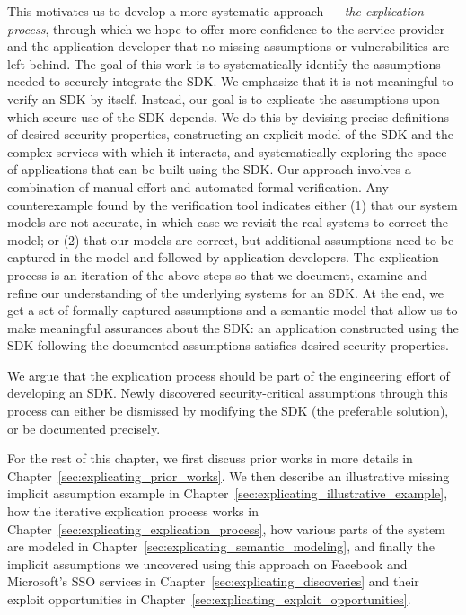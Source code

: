 This motivates us to develop a more systematic approach --- \emph{the explication process}, through which we hope to offer more confidence to the service provider and the application developer that no missing assumptions or vulnerabilities are left behind.  The goal of this work is to systematically identify the assumptions needed to securely integrate the SDK.  We emphasize that it is not meaningful to verify an SDK by itself.  Instead, our goal is to explicate the assumptions upon which secure use of the SDK depends.  We do this by devising precise definitions of desired security properties, constructing an explicit model of the SDK and the complex services with which it interacts, and systematically exploring the space of applications that can be built using the SDK.  Our approach involves a combination of manual effort and automated formal verification.  Any counterexample found by the verification tool indicates either (1) that our system models are not accurate, in which case we revisit the real systems to correct the model; or (2) that our models are correct, but additional assumptions need to be captured in the model and followed by application developers.  The explication process is an iteration of the above steps so that we document, examine and refine our understanding of the underlying systems for an SDK.  At the end, we get a set of formally captured assumptions and a semantic model that allow us to make meaningful assurances about the SDK: an application constructed using the SDK following the documented assumptions satisfies desired security properties.

We argue that the explication process should be part of the engineering effort of developing an SDK.  Newly discovered security-critical assumptions through this process can either be dismissed by modifying the SDK (the preferable solution), or be documented precisely.

For the rest of this chapter, we first discuss prior works in more details in Chapter~\ref{sec:explicating_prior_works}.  We then describe an illustrative missing implicit assumption example in Chapter~\ref{sec:explicating_illustrative_example}, how the iterative explication process works in Chapter~\ref{sec:explicating_explication_process}, how various parts of the system are modeled in Chapter~\ref{sec:explicating_semantic_modeling}, and finally the implicit assumptions we uncovered using this approach on Facebook and Microsoft's SSO services in Chapter~\ref{sec:explicating_discoveries} and their exploit opportunities in Chapter~\ref{sec:explicating_exploit_opportunities}.

